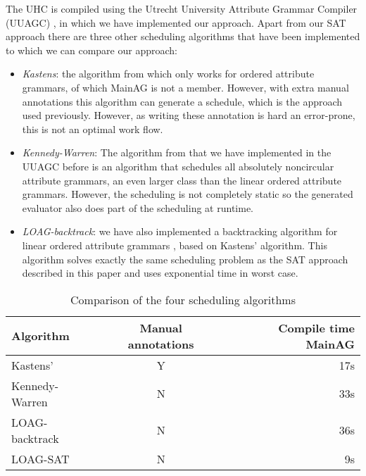 \documentclass{llncs}
\begin{document}
The UHC is compiled using the Utrecht University Attribute Grammar Compiler (UUAGC) \cite{combinator-languages}, in which we have implemented our approach. Apart from our SAT approach there are three other scheduling algorithms that have been implemented to which we can compare our approach:

\begin{itemize}
\item \emph{Kastens}: the algorithm from \cite{kastens80} which only works for ordered attribute grammars, of which MainAG is not a member. However, with extra manual annotations this algorithm can generate a schedule, which is the approach used previously. However, as writing these annotation is hard an error-prone, this is not an optimal work flow.
\item \emph{Kennedy-Warren}: The algorithm from \cite{kennedywarren76} that we have implemented in the UUAGC before \cite{bransen2012} is an algorithm that schedules all absolutely noncircular attribute grammars, an even larger class than the linear ordered attribute grammars. However, the scheduling is not completely static so the generated evaluator also does part of the scheduling at runtime. 
\item \emph{LOAG-backtrack}: we have also implemented a backtracking algorithm for linear ordered attribute grammars \cite{Binsbergen:2015}, based on Kastens' algorithm. This algorithm solves exactly the same scheduling problem as the SAT approach described in this paper and uses exponential time in worst case.
\end{itemize} 

\begin{table}
  \begin{center}
    \begin{tabular}{l || c || r}
      Algorithm   &   Manual annotations   &  Compile time MainAG \\
      \hline
      Kastens'                &   Y           &   17s \\
      Kennedy-Warren  &   N           &   33s \\
      LOAG-backtrack  &   N           &   36s \\
      LOAG-SAT           &   N           &   9s \\
    \end{tabular}
  \end{center}
  \caption{Comparison of the four scheduling algorithms}
  \label{tab:algo-comparison}
\end{table}
\end{document}
